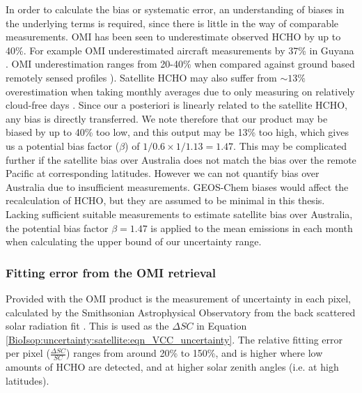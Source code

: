     In order to calculate the bias or systematic error, an understanding of biases in the underlying terms is required, since there is little in the way of comparable measurements.
    OMI has been seen to underestimate observed HCHO by up to 40\%.
    For example OMI underestimated aircraft measurements by 37\% in Guyana \parencite{Barkley2013}.
    OMI underestimation ranges from 20-40\% when compared against ground based remotely sensed profiles \parencite{Zhu2016,DeSmedt2015}).
    Satellite HCHO may also suffer from $\sim13\%$ overestimation when taking monthly averages due to only measuring on relatively cloud-free days \parencite{Surl2018}.
    Since our a posteriori is linearly related to the satellite HCHO, any bias is directly transferred.
    We note therefore that our product may be biased by up to 40\% too low, and this output may be 13\% too high, which gives us a potential bias factor ($\beta$) of $1/0.6 \times 1/1.13 = 1.47$.
    This may be complicated further if the satellite bias over Australia does not match the bias over the remote Pacific at corresponding latitudes.
    However we can not quantify bias over Australia due to insufficient measurements.
    GEOS-Chem biases would affect the recalculation of HCHO, but they are assumed to be minimal in this thesis.
    Lacking sufficient suitable measurements to estimate satellite bias over Australia, the potential bias factor $\beta = 1.47$ is applied to the mean emissions in each month when calculating the upper bound of our uncertainty range.
    
    \subsubsection{Fitting error from the OMI retrieval}
      \label{BioIsop:uncertainty:satellite:fitting}
      
      Provided with the OMI product is the measurement of uncertainty in each pixel, calculated by the Smithsonian Astrophysical Observatory from the back scattered solar radiation fit \parencite{Abad2015,Abad2016}.
      This is used as the $\Delta SC$ in Equation \ref{BioIsop:uncertainty:satellite:eqn_VCC_uncertainty}.
      The relative fitting error per pixel ($\frac{\Delta SC}{SC}$) ranges from around 20\% to 150\%, and is higher where low amounts of HCHO are detected, and at higher solar zenith angles (i.e. at high latitudes).
    
